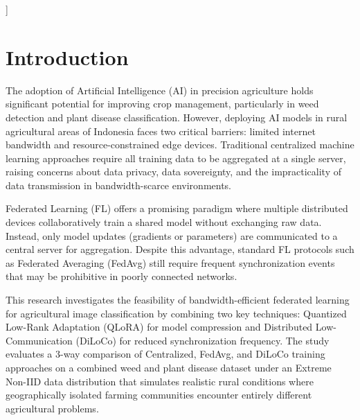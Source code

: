 \documentclass[conference, compsoc, twoside]{IEEEtran}
\begin{document}
{	%
}
]

%
\IEEEpeerreviewmaketitle
\thispagestyle{firststyle}
\graphicspath{{pics/}{../../../experiments/results/plots/}}

\section{Introduction}

The adoption of Artificial Intelligence (AI) in precision agriculture holds significant potential for improving crop management, particularly in weed detection and plant disease classification. However, deploying AI models in rural agricultural areas of Indonesia faces two critical barriers: limited internet bandwidth and resource-constrained edge devices. Traditional centralized machine learning approaches require all training data to be aggregated at a single server, raising concerns about data privacy, data sovereignty, and the impracticality of data transmission in bandwidth-scarce environments.

Federated Learning (FL) offers a promising paradigm where multiple distributed devices collaboratively train a shared model without exchanging raw data. Instead, only model updates (gradients or parameters) are communicated to a central server for aggregation. Despite this advantage, standard FL protocols such as Federated Averaging (FedAvg) still require frequent synchronization events that may be prohibitive in poorly connected networks.

This research investigates the feasibility of bandwidth-efficient federated learning for agricultural image classification by combining two key techniques: Quantized Low-Rank Adaptation (QLoRA) for model compression and Distributed Low-Communication (DiLoCo) for reduced synchronization frequency. The study evaluates a 3-way comparison of Centralized, FedAvg, and DiLoCo training approaches on a combined weed and plant disease dataset under an Extreme Non-IID data distribution that simulates realistic rural conditions where geographically isolated farming communities encounter entirely different agricultural problems.
\end{document}

